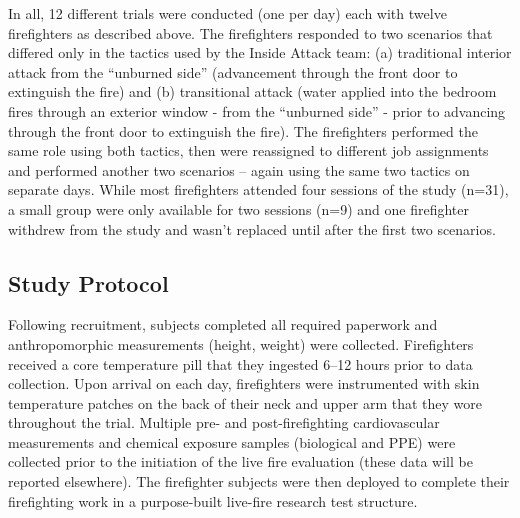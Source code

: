 \documentclass[12pt,oneside]{article}
\begin{document}
In all, 12 different trials were conducted (one per day) each with twelve firefighters as described above.  The firefighters responded to two scenarios that differed only in the tactics used by the Inside Attack team: (a) traditional interior attack from the ``unburned side'' (advancement through the front door to extinguish the fire) and (b) transitional attack (water applied into the bedroom fires through an exterior window - from the ``unburned side'' - prior to advancing through the front door to extinguish the fire).  The firefighters performed the same role using both tactics, then were reassigned to different job assignments and performed another two scenarios – again using the same two tactics on separate days.  While most firefighters attended four sessions of the study (n=31), a small group were only available for two sessions (n=9) and one firefighter withdrew from the study and wasn't replaced until after the first two scenarios.

\subsection{Study Protocol}
Following recruitment, subjects completed all required paperwork and anthropomorphic measurements (height, weight) were collected.  Firefighters received a core temperature pill that they ingested 6–12 hours prior to data collection. Upon arrival on each day, firefighters were instrumented with skin temperature patches on the back of their neck and upper arm that they wore throughout the trial. Multiple pre- and post-firefighting cardiovascular measurements and chemical exposure samples (biological and PPE) were collected prior to the initiation of the live fire evaluation (these data will be reported elsewhere).  The firefighter subjects were then deployed to complete their firefighting work in a purpose-built live-fire research test structure. 
\end{document}
